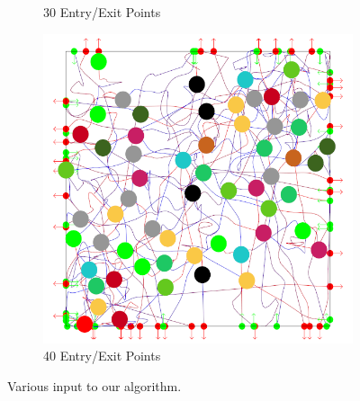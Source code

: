 \begin{figure}[t]
\begin{subfigure}[b]{0.24\linewidth}
	\caption{30 Entry/Exit Points}
 \end{subfigure}
%
 \begin{subfigure}[b]{0.24\linewidth}
	\includegraphics[width=\linewidth]{images/res-40-entry-exit.png}
	\caption{40 Entry/Exit Points}
 \end{subfigure}
%
\caption{Various input to our algorithm.}
\label{fig:res:inputs}
\end{figure}



